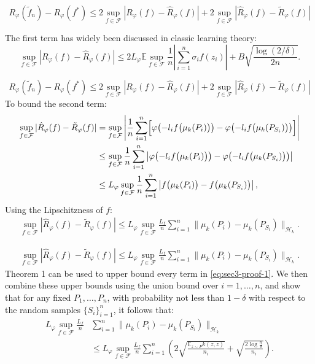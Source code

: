 \documentclass{beamer}
\renewcommand{\H}{\mathcal{H}}
\newcommand{\F}{\mathcal{F}}
\newcommand{\Rp}{R_{\varphi}}
\newcommand{\Rpn}{\hat{R}_{\varphi}}
\newcommand{\Rpnt}{\tilde{R}_{\varphi}}
\newcommand{\f}{f^*}
\newcommand{\fnt}{\tilde{f}_n}
\begin{document}
\begin{frame}
$$
\Rp(\fnt) - \Rp(\f)
\leq
2\sup_{f\in \F}|\Rp(f) - \Rpn(f)|
+
2\sup_{f\in \F}|\Rpn(f) - \Rpnt(f)|$$

The first term has widely been discussed in classic learning theory:
\begin{equation}
\label{eq:excess-bound2}
\sup_{f\in\F}|\Rp(f) - \Rpn(f)|
\leq
2 L_\varphi \mathbb{E}{\sup_{f\in \F}\frac{1}{n}\left|\sum_{i=1}^n \sigma_i f(z_i)\right|} + B\sqrt{\frac{\log(2/\delta)}{2n}}.
\end{equation}
\end{frame}

\begin{frame}
$$
\Rp(\fnt) - \Rp(\f)
\leq
2\sup_{f\in \F}|\Rp(f) - \Rpn(f)|
+
2\sup_{f\in \F}|\Rpn(f) - \Rpnt(f)|$$
\pause
To bound the second term:
\begin{align*}
\notag
\sup_{f\in \F}|\Rpn(f) - \Rpnt(f)| 
&=
\sup_{f\in \F}\left|
\frac{1}{n}
\sum_{i=1}^n\Bigl[\varphi\bigl(-l_if\bigl(\mu_k(P_i)\bigr)\bigr) - \varphi\bigl(-l_i f\bigl(\mu_k(P_{S_i})\bigr)\bigr)\Bigr]
\right| \\
\notag
&\leq
\sup_{f\in \F}
\frac{1}{n}
\sum_{i=1}^n
\left|
\varphi\bigl(-l_if\bigl(\mu_k(P_i)\bigr)\bigr) - \varphi\bigl(-l_i f\bigl(\mu_k(P_{S_i})\bigr)\bigr)
\right| \\
\notag
&\leq
L_\varphi\sup_{f\in \F}
\frac{1}{n}
\sum_{i=1}^n
\left|
f\bigl(\mu_k(P_i)\bigr) - f\bigl(\mu_k(P_{S_i})\bigr)
\right|,
\end{align*}
\pause
Using the Lipschitzness of $f$:
\begin{align*}
\sup_{f\in \F}|\Rpn(f) - \Rpnt(f)| \leq
L_\varphi\sup_{f\in \F}
\frac{L_f}{n}
\sum_{i=1}^n
\|
\mu_k(P_i) - \mu_k(P_{S_i})
\|_{\H_k}.
\end{align*}
\end{frame}


\begin{frame}
\begin{align}
\label{eq:sec3-proof-1}
\sup_{f\in \F}|\Rpn(f) - \Rpnt(f)| \leq
L_\varphi\sup_{f\in \F}
\frac{L_f}{n}
\sum_{i=1}^n
\|
\mu_k(P_i) - \mu_k(P_{S_i})
\|_{\H_k}.
\end{align}
Theorem 1 can be used to upper bound every term in \eqref{eq:sec3-proof-1}. We then combine these upper bounds using the union bound over $i=1,\dots,n$, and show
that for any fixed $P_1,\dots,P_n$, with probability not less than $1-\delta$
with respect to the random samples $\{S_i\}_{i=1}^n$, it follows that:
\begin{align}
L_\varphi\sup_{f\in \F}
\frac{L_f}{n}
&\sum_{i=1}^n
\|
\mu_k(P_i) - \mu_k(P_{S_i})
\|_{\H_k}\nonumber\\
&\leq
L_\varphi\sup_{f\in \F}
\frac{L_f}{n}
\sum_{i=1}^n
\left(
2\sqrt{\frac{\mathbb{E}_{z\sim P}{k(z,z)}}{n_i}} + \sqrt{\frac{2\log\frac{n}{\delta}}{n_i}}
\right).
\label{eq:excess-bound3}
\end{align}
\end{frame}
\end{document}

